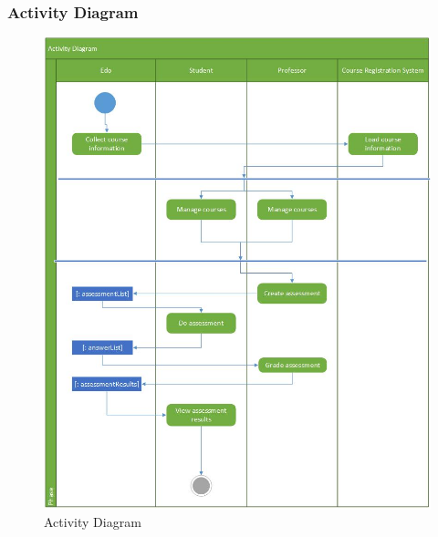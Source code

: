 \documentclass{beamer}
\begin{document}
\begin{frame}
	\frametitle{Activity Diagram}
	\begin{figure}[!ht]
		\begin{center}
			\includegraphics[width=\textwidth,height=0.7\textheight,keepaspectratio]{activity_diagram}
		\end{center}
		\caption{Activity Diagram}
	\end{figure}
	
\end{frame}
\end{document}
